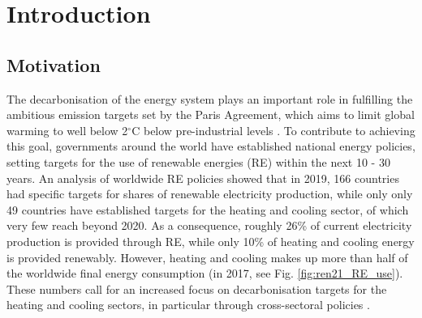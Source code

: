 \cleardoublepage
\chapter{Introduction}
\label{intro}

\section{Motivation}
\label{intro_motivation}


The decarbonisation of the energy system plays an important role in fulfilling the ambitious emission targets set by the Paris Agreement, which aims to limit global warming to well below 2$^\circ$C below pre-industrial levels \cite{rogelj_paris_2016}.
To contribute to achieving this goal, governments around the world have established national energy policies, setting targets for the use of renewable energies (RE) within the next 10 - 30 years. 
An analysis of worldwide RE policies \cite{ren21_renewables_2020} showed that in 2019, 166 countries had specific targets for shares of renewable electricity production, while only only 49 countries have established targets for the heating and cooling sector, of which very few reach beyond 2020. 
As a consequence, roughly 26\% of current electricity production is provided through RE, while only 10\% of heating and cooling energy is provided renewably. However, heating and cooling makes up more than half of the worldwide final energy consumption (in 2017, see Fig. \ref{fig:ren21_RE_use}). These numbers call for an increased focus on decarbonisation targets for the heating and cooling sectors, in particular through cross-sectoral policies  \cite{ren21_renewables_2020}.

